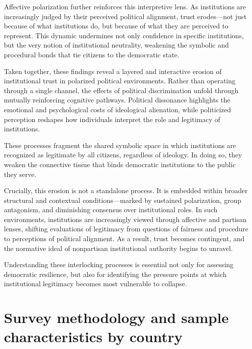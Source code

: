 \documentclass{article}
\begin{document}
Affective polarization further reinforces this interpretive lens. As institutions are increasingly judged by their perceived political alignment, trust erodes—not just because of what institutions do, but because of what they are perceived to represent. This dynamic undermines not only confidence in specific institutions, but the very notion of institutional neutrality, weakening the symbolic and procedural bonds that tie citizens to the democratic state.

Taken together, these findings reveal a layered and interactive erosion of institutional trust in polarized political environments. Rather than operating through a single channel, the effects of political discrimination unfold through mutually reinforcing cognitive pathways. Political dissonance highlights the emotional and psychological costs of ideological alienation, while politicized perception reshapes how individuals interpret the role and legitimacy of institutions.

These processes fragment the shared symbolic space in which institutions are recognized as legitimate by all citizens, regardless of ideology. In doing so, they weaken the connective tissue that binds democratic institutions to the public they serve.

Crucially, this erosion is not a standalone process. It is embedded within broader structural and contextual conditions—marked by sustained polarization, group antagonism, and diminishing consensus over institutional roles. In such environments, institutions are increasingly viewed through affective and partisan lenses, shifting evaluations of legitimacy from questions of fairness and procedure to perceptions of political alignment. As a result, trust becomes contingent, and the normative ideal of nonpartisan institutional authority begins to unravel.

Understanding these interlocking processes is essential not only for assessing democratic resilience, but also for identifying the pressure points at which institutional legitimacy becomes most vulnerable to collapse.

% 
% 
\printbibliography

\newpage
\appendix
\section{Survey methodology and sample characteristics by country}
\label{appendix:a}

\end{document}
